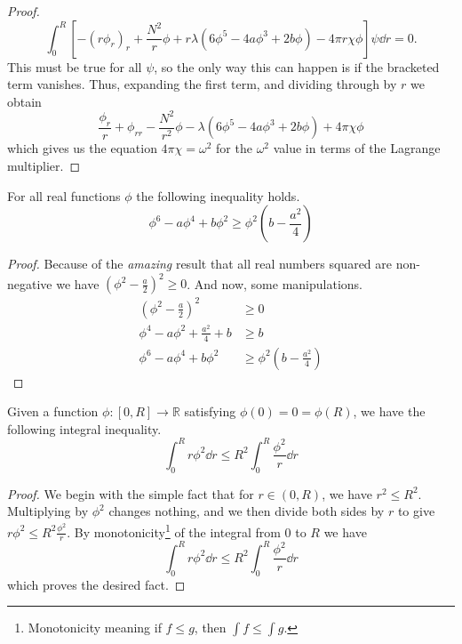 \begin{proof}
    \begin{equation}
        \int_0^R\left[-\left(r\phi_r\right)_r + \frac{N^2}{r}\phi + r\lambda\left(6\phi^5 - 4a\phi^3 + 2b\phi\right) - 4\pi r\chi \phi\right]\psi\dd{r} = 0.
    \end{equation}
    This must be true for all \(\psi\), so the only way this can happen is if the bracketed term vanishes. Thus, expanding the first term, and dividing through by \(r\) we obtain
    \begin{equation}
        \frac{\phi_r}{r} + \phi_{rr} - \frac{N^2}{r^2}\phi - \lambda\left(6\phi^5 - 4a\phi^3 + 2b\phi\right) + 4\pi\chi \phi
    \end{equation}
    which gives us the equation \(4\pi\chi = \omega^2\) for the \(\omega^2\) value in terms of the Lagrange multiplier.
\end{proof}

\begin{lemma}\label{lem:ineq1}
    For all real functions \(\phi\) the following inequality holds.
    \begin{equation}
        \phi^6 - a\phi^4 + b\phi^2 \geq \phi^2\left(b - \frac{a^2}{4}\right)
    \end{equation}
\end{lemma}
\begin{proof}
    Because of the \textit{amazing} result that all real numbers squared are
    non-negative we have \(\left(\phi^2 - \frac{a}{2}\right)^2\geq 0\). And now,
    some manipulations.
    \begin{align*}
        \left(\phi^2 - \frac{a}{2}\right)^2  & \geq 0                                    \\
        \phi^4 - a\phi^2 + \frac{a^2}{4} + b & \geq b                                    \\
        \phi^6 - a\phi^4 + b\phi^2           & \geq \phi^2\left(b - \frac{a^2}{4}\right)
    \end{align*}
\end{proof}
\begin{lemma}\label{lem:ineq2}
    Given a function \(\phi:[0,R]\to \mathbb{R}\) satisfying \(\phi(0) = 0 = \phi(R)\), we have the following integral inequality.
    \begin{equation}
        \int_0^R r\phi^2\dd{r}\leq R^2\int_0^R\frac{\phi^2}{r}\dd{r}
    \end{equation}
\end{lemma}
\begin{proof}
    We begin with the simple fact that for \(r\in(0,R)\), we have
    \(r^2\leq R^2\). Multiplying by \(\phi^2\) changes nothing, and we then
    divide both sides by \(r\) to give \(r\phi^2\leq R^2\frac{\phi^2}{r}\). By
    monotonicity\footnote{Monotonicity meaning if \(f\leq g\), then
        \(\int f\leq \int g\).} of the integral from \(0\) to \(R\) we have
    \begin{equation}
        \int_0^R r\phi^2\dd{r}\leq R^2\int_0^R\frac{\phi^2}{r}\dd{r}
    \end{equation}
    which proves the desired fact.
\end{proof}

